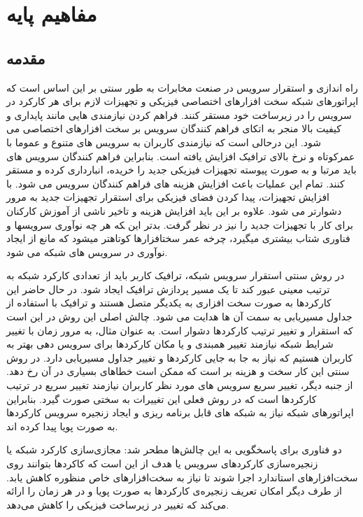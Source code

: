 \chapter{مفاهیم پایه}

\section{مقدمه}

راه اندازی و استقرار سرویس در صنعت مخابرات به طور سنتی بر این اساس است که اپراتورهای شبکه سخت افزارهای اختصاصی فیزیکی و تجهیزات لازم برای هر کارکرد در سرویس را در زیرساخت خود مستقر کنند.
فراهم کردن نیازمندی هایی مانند پایداری و کیفیت بالا منجر به اتکای فراهم کنندگان سرویس بر سخت افزارهای اختصاصی می شود. 
این درحالی است که نیازمندی کاربران به سرویس های متنوع و عموما با عمرکوتاه و نرخ بالای ترافیک افزایش یافته است.
بنابراین فراهم کنندگان سرویس های باید مرتبا و به صورت پیوسته تجهیزات فیزیکی جدید را خریده، انبارداری کرده و مستقر کنند.
تمام این عملیات باعث افزایش هزینه های فراهم کنندگان سرویس می شود.
با افزایش تجهیزات، پیدا کردن فضای فیزیکی برای استقرار تجهیزات جدید به مرور دشوارتر می شود.
علاوه بر این باید افزایش هزینه و تاخیر ناشی از آموزش کارکنان برای کار با تجهیزات جدید را نیز در نظر گرفت.
بدتر این ‍که هر چه نوآوری سرویس‍ها و فناوری شتاب بیشتری می‍گیرد، چرخه عمر سخت‍افزارها کوتاه‍تر می‍شود که مانع از ایجاد نوآوری در سرویس های شبکه می شود.

در روش سنتی استقرار سرویس شبکه، ترافیک کاربر باید از تعدادی کارکرد شبکه به ترتیب معینی عبور کند تا یک مسیر پردازش ترافیک ایجاد شود.
در حال حاضر این کارکردها به صورت سخت افزاری به یکدیگر متصل هستند و ترافیک با استفاده از جداول مسیریابی به سمت آن ها هدایت می شود.
چالش اصلی این روش در این است که استقرار و تغییر ترتیب کارکردها دشوار است.
به عنوان مثال، به مرور زمان با تغییر شرایط شبکه نیازمند تغییر همبندی و یا مکان کارکردها برای سرویس دهی بهتر به کاربران هستیم که نیاز به جا به جایی کارکردها و تغییر جداول مسیریابی دارد.
در روش سنتی این کار سخت و هزینه بر است که ممکن است خطاهای بسیاری در آن رخ دهد.
از جنبه دیگر، تغییر سریع سرویس های مورد نظر کاربران نیازمند تغییر سریع در ترتیب کارکردها است که در روش فعلی این تغییرات به سختی صورت گیرد.
بنابراین اپراتورهای شبکه نیاز به شبکه های قابل برنامه ریزی و ایجاد زنجیره سرویس کارکردها به صورت پویا پیدا کرده اند.

دو فناوری برای پاسخگویی به این چالش‌ها مطحر شد:
مجازی‌سازی کارکرد شبکه یا 
زنجیره‌سازی کارکردهای سرویس یا 
هدف از
این است که کاکردها بتوانند روی سخت‌افزارهای استاندارد اجرا شوند
تا نیاز به سخت‌افزارهای خاص منظوره کاهش یابد.
از طرف دیگر
امکان تعریف زنجیره‌ی کارکردها به صورت پویا و در هر زمان را ارائه می‌کند که تغییر در زیرساخت فیزیکی را کاهش می‌دهد.


